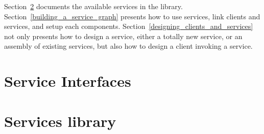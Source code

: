 Section~\ref{services_library} documents the available services in the library. Section~\ref{building_a_service_graph} presents how to use services, link clients and services, and setup each components. Section~\ref{designing_clients_and_services} not only presents how to design a service, either a totally new service, or an assembly of existing services, but also how to design a client invoking a service.


\section{Service Interfaces}
\label{service_interfaces}

\section{Services library}
\label{services_library}


